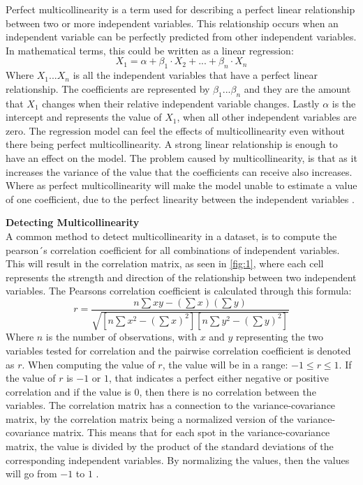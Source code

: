 Perfect multicollinearity is a term used for describing a perfect linear relationship between two or more independent variables. This relationship occurs when an independent variable can be perfectly predicted from other independent variables. In mathematical terms, this could be written as a linear regression:
\begin{equation}
X_1 = \alpha+\beta_1\cdot X_2+...+\beta_n\cdot X_n
\end{equation}
Where $X_1...X_n$ is all the independent variables that have a perfect linear relationship. The coefficients are represented by $\beta_1...\beta_n$ and they are the amount that $X_1$ changes when their relative independent variable changes.
Lastly $\alpha$ is the intercept and represents the value of $X_1$, when all other independent variables are zero.
\newline
The regression model can feel the effects of multicollinearity even without there being perfect multicollinearity. A strong linear relationship is enough to have an effect on the model. The problem caused by multicollinearity, is that as it increases the variance of the value that the coefficients can receive also increases. Where as perfect multicollinearity will make the model unable to estimate a value of one coefficient, due to the perfect linearity between the independent variables \cite{MultAndMis}.
\newline

\noindent \textbf{Detecting Multicollinearity}\\
A common method to detect multicollinearity in a dataset, is to compute the pearson´s correlation coefficient for all combinations of independent variables. This will result in the correlation matrix, as seen in \autoref{fig:1}, where each cell represents the strength and direction of the relationship between two independent variables. The Pearsons correlation coefficient is calculated through this formula:
\begin{equation}
r = \frac{n \sum xy - (\sum x)(\sum y)}{\sqrt{[n \sum x^2 - (\sum x)^2][n \sum y^2 - (\sum y)^2]}}
\end{equation}
Where $n$ is the number of observations, with $x$ and $y$ representing the two variables tested for correlation and the pairwise correlation coefficient is denoted as $r$. When computing the value of $r$, the value will be in a range: $-1\leq r \leq 1$. If the value of $r$ is $-1$ or $1$, that indicates a perfect either negative or positive correlation and if the value is $0$, then there is no correlation between the variables. The correlation matrix has a connection to the variance-covariance matrix, by the correlation matrix being a normalized version of the variance-covariance matrix. This means that for each spot in the variance-covariance matrix, the value is divided by the product of the standard deviations of the corresponding independent variables. By normalizing the values, then the values will go from $-1$ to $1$ \cite{DetectMulti}. \newline




